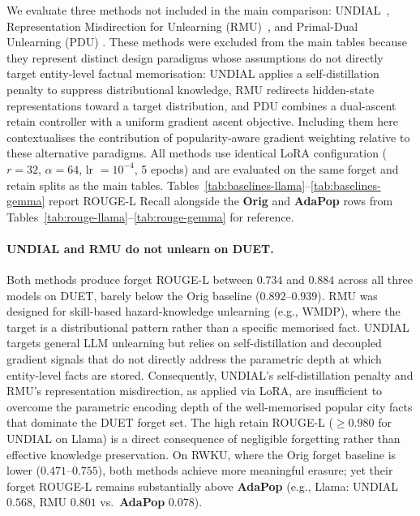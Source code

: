 We evaluate three methods not included in the main comparison: UNDIAL~\cite{dong2025undial}, Representation Misdirection for Unlearning (RMU)~\cite{li2024representation}, and Primal-Dual Unlearning (PDU) \cite{entesariconstrained}. These methods were excluded from the main tables because they represent distinct design paradigms whose assumptions do not directly target entity-level factual memorisation: UNDIAL applies a self-distillation penalty to suppress distributional knowledge, RMU redirects hidden-state representations toward a target distribution, and PDU combines a dual-ascent retain controller with a uniform gradient ascent objective. Including them here contextualises the contribution of popularity-aware gradient weighting relative to these alternative paradigms. All methods use identical LoRA configuration ($r{=}32$, $\alpha{=}64$, lr $= 10^{-4}$, 5 epochs) and are evaluated on the same forget and retain splits as the main tables. Tables~\ref{tab:baselines-llama}--\ref{tab:baselines-gemma} report ROUGE-L Recall alongside the \textbf{Orig} and \textbf{AdaPop} rows from Tables~\ref{tab:rouge-llama}--\ref{tab:rouge-gemma} for reference.

\paragraph{UNDIAL and RMU do not unlearn on DUET.}
Both methods produce forget ROUGE-L between $0.734$ and $0.884$ across all three models on DUET, barely below the Orig baseline ($0.892$--$0.939$). RMU was designed for skill-based hazard-knowledge unlearning (e.g., WMDP), where the target is a distributional pattern rather than a specific memorised fact. UNDIAL targets general LLM unlearning but relies on self-distillation and decoupled gradient signals that do not directly address the parametric depth at which entity-level facts are stored. Consequently, UNDIAL's self-distillation penalty and RMU's representation misdirection, as applied via LoRA, are insufficient to overcome the parametric encoding depth of the well-memorised popular city facts that dominate the DUET forget set. The high retain ROUGE-L ($\geq 0.980$ for UNDIAL on Llama) is a direct consequence of negligible forgetting rather than effective knowledge preservation. On RWKU, where the Orig forget baseline is lower ($0.471$--$0.755$), both methods achieve more meaningful erasure; yet their forget ROUGE-L remains substantially above \textbf{AdaPop} (e.g., Llama: UNDIAL $0.568$, RMU $0.801$ vs.\ \textbf{AdaPop} $0.078$).

